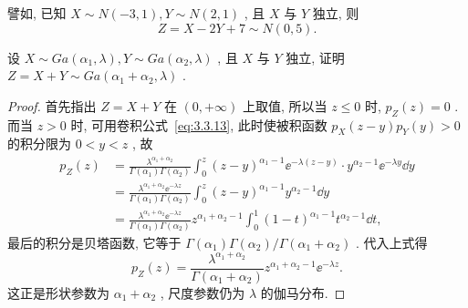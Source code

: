    譬如, 已知 $X\sim N(-3,1),Y\sim N(2,1)$ , 且 $X$ 与 $Y$ 独立, 则
   \begin{equation*}
   	Z=X-2Y+7\sim N(0,5).
   \end{equation*}
   \begin{example}[(伽玛分布的可加性)]\label{exam:3.3.7}
   	设 $X\sim Ga(\alpha_1,\lambda),Y\sim Ga(\alpha_2,\lambda)$ , 且 $X$ 与 $Y$ 独立, 证明 $Z=X+Y\sim Ga(\alpha_1+\alpha_2,\lambda)$ .
   	\begin{proof}
   		首先指出 $Z=X+Y$ 在 $(0,+\infty)$ 上取值, 所以当 $z\leqslant0$ 时, $p_{Z}(z)=0$ . 而当 $z>0$ 时, 可用卷积公式~\ref{eq:3.3.13}, 此时使被积函数 $p_{X}(z-y)p_{Y}(y)>0$ 的积分限为 $0<y<z$ , 故
   		\begin{align*}
   			p_{Z}(z)&=\frac{\lambda^{\alpha_1+\alpha_2}}{\Gamma(\alpha_1)\Gamma(\alpha_2)}\int_{0}^{z}(z-y)^{\alpha_1-1}\ee^{-\lambda(z-y)}\cdot y^{\alpha_2-1}\ee^{-\lambda y}\dd y\\
   			&=\frac{\lambda^{\alpha_1+\alpha_2}\ee^{-\lambda z}}{\Gamma(\alpha_1)\Gamma(\alpha_2)}\int_{0}^{z}(z-y)^{\alpha_1-1}y^{\alpha_2-1}\dd y\\
   			&=\frac{\lambda^{\alpha_1+\alpha_2}\ee^{-\lambda z}}{\Gamma(\alpha_1)\Gamma(\alpha_2)}z^{\alpha_1+\alpha_2-1}\int_{0}^{1}(1-t)^{\alpha_1-1}t^{\alpha_2-1}\dd t,
   		\end{align*}
   		最后的积分是贝塔函数, 它等于 $\Gamma(\alpha_1)\Gamma(\alpha_2)/\Gamma(\alpha_1+\alpha_2)$ . 代入上式得
   		\begin{equation*}
   			p_{Z}(z)=\frac{\lambda^{\alpha_1+\alpha_2}}{\Gamma(\alpha_1+\alpha_2)}z^{\alpha_1+\alpha_2-1}\ee^{-\lambda z}.
   		\end{equation*}
   		这正是形状参数为 $\alpha_1+\alpha_2$ , 尺度参数仍为 $\lambda$ 的伽马分布.
   		

\end{proof}
\end{example}
